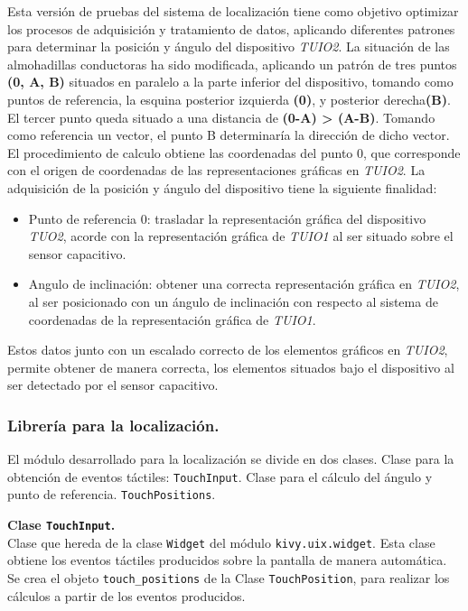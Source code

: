 Esta versión de pruebas del sistema de localización tiene como objetivo optimizar los procesos de adquisición y tratamiento de datos, aplicando diferentes patrones para determinar la posición y ángulo del dispositivo \emph{TUIO2}.
La situación de las almohadillas conductoras ha sido modificada, aplicando un patrón de tres puntos \textbf{(0, A, B)} situados en paralelo a la parte inferior del dispositivo, tomando como puntos de referencia, la esquina posterior izquierda \textbf{(0)}, y posterior derecha\textbf{(B)}. El tercer punto queda situado a una distancia de \textbf{(0-A) > (A-B)}. Tomando como referencia un vector, el punto B determinaría la dirección de dicho vector.
El procedimiento de calculo obtiene las coordenadas del punto 0, que corresponde con el origen de coordenadas de las representaciones gráficas en \emph{TUIO2}.
La adquisición de la posición y ángulo del dispositivo tiene la siguiente finalidad:
\begin{itemize}
\item Punto de referencia 0: trasladar la representación gráfica del dispositivo \emph{TUO2}, acorde con la representación gráfica de \emph{TUIO1} al ser situado sobre el sensor capacitivo.
\item Angulo de inclinación: obtener una correcta representación gráfica en \emph{TUIO2}, al ser posicionado con un ángulo de inclinación con respecto al sistema de coordenadas de la representación gráfica de \emph{TUIO1}.
\end{itemize}
Estos datos junto con un escalado correcto de los elementos gráficos en \emph{TUIO2}, permite obtener de manera correcta, los elementos situados bajo el dispositivo al ser detectado por el sensor capacitivo.


\subsubsection{Librería para la localización.}
El módulo desarrollado para la localización se divide en dos clases.
Clase para la obtención de eventos táctiles: \texttt{TouchInput}.
Clase para el cálculo del ángulo y punto de referencia. \texttt{TouchPositions}.

\textbf{Clase \texttt{TouchInput}.}\\ 
Clase que hereda de la clase \texttt{Widget} del módulo \texttt{kivy.uix.widget}. Esta clase obtiene los eventos táctiles producidos sobre la pantalla de manera automática. Se crea el objeto \texttt{touch\_positions} de la Clase \texttt{TouchPosition}, para realizar los cálculos a partir de los eventos producidos.

